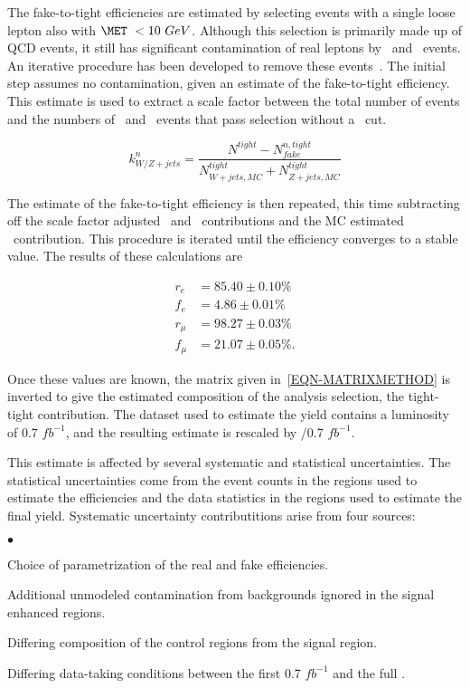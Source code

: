 The fake-to-tight efficiencies are estimated by selecting events with a single loose lepton also with $\MET\ < 10\ GeV$. Although this selection is primarily made up of QCD events, it still has significant contamination of real leptons by \Wjets\ and \Zjets\ events. An iterative procedure has been developed to remove these events~\cite{LEPJETINTNOTE}. The initial step assumes no contamination, given an estimate of the fake-to-tight efficiency. This estimate is used to extract a scale factor between the total number of events and the numbers of \Wjets\ and \Zjets\ events that pass selection without a \MET\ cut.

\begin{equation}
k^{n}_{W/Z+jets} = \frac{N^{tight}-N^{n,tight}_{fake}}{N^{tight}_{W+jets,MC}+N^{tight}_{Z+jets,MC}}
\end{equation}

\noindent
The estimate of the fake-to-tight efficiency is then repeated, this time subtracting off the scale factor adjusted \Wjets\ and \Zjets\ contributions and the MC estimated \TTbar\ contribution. This procedure is iterated until the efficiency converges to a stable value. The results of these calculations are

\begin{equation}
  \begin{split}
    r_e &= 85.40 \pm 0.10\% \\
    f_e &= 4.86  \pm 0.01\% \\
    r_\mu &= 98.27 \pm 0.03\% \\
    f_\mu &= 21.07 \pm 0.05\%.
  \end{split}
\end{equation}

\noindent
Once these values are known, the matrix given in~\ref{EQN-MATRIXMETHOD} is inverted to give the estimated composition of the analysis selection, the tight-tight contribution. The dataset used to estimate the yield contains a luminosity of 0.7 $fb^{-1}$, and the resulting estimate is rescaled by \LUMI/0.7 $fb^{-1}$.

This estimate is affected by several systematic and statistical uncertainties. The statistical uncertainties come from the event counts in the regions used to estimate the efficiencies and the data statistics in the regions used to estimate the final yield. Systematic uncertainty contributitions arise from four sources:
\begin{list} {$\bullet$} {}
\item Choice of parametrization of the real and fake efficiencies.
\item Additional unmodeled contamination from backgrounds ignored in the signal enhanced regions.
\item Differing composition of the control regions from the signal region.
\item Differing data-taking conditions between the first 0.7 $fb^{-1}$ and the full \LUMI.
\end{list}

